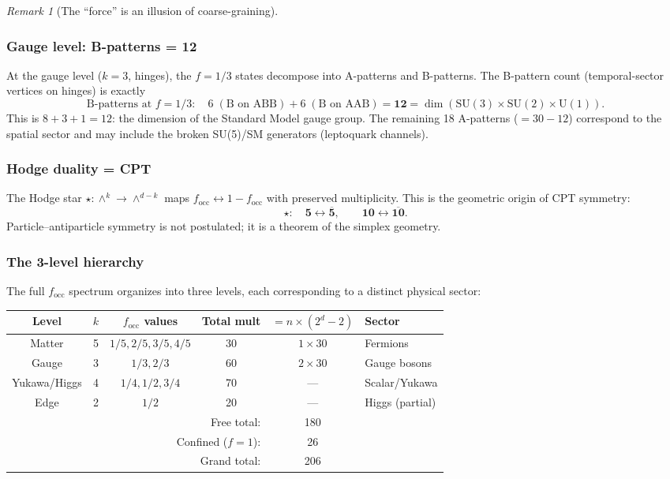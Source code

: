 \documentclass[12pt]{article}
\theoremstyle{remark}
\newtheorem{remark}[theorem]{Remark}
\theoremstyle{definition}
\begin{document}
\begin{remark}[The ``force'' is an illusion of coarse-graining]
\subsubsection{Gauge level: B-patterns = 12}

At the gauge level ($k = 3$, hinges), the $f = 1/3$ states decompose into A-patterns and B-patterns.  The B-pattern count (temporal-sector vertices on hinges) is exactly
\begin{equation}
\text{B-patterns at } f = 1/3: \quad 6\;(\text{B on ABB}) + 6\;(\text{B on AAB}) = \mathbf{12} = \dim(\text{SU}(3) \times \text{SU}(2) \times \text{U}(1)).
\end{equation}
This is $8 + 3 + 1 = 12$: the dimension of the Standard Model gauge group.  The remaining 18 A-patterns ($= 30 - 12$) correspond to the spatial sector and may include the broken SU(5)/SM generators (leptoquark channels).

\subsubsection{Hodge duality = CPT}

The Hodge star $\star: \wedge^k \to \wedge^{d-k}$ maps $f_\mathrm{occ} \leftrightarrow 1 - f_\mathrm{occ}$ with preserved multiplicity.  This is the geometric origin of CPT symmetry:
\begin{equation}
\star: \quad \mathbf{5} \leftrightarrow \overline{\mathbf{5}}, \qquad \mathbf{10} \leftrightarrow \overline{\mathbf{10}}.
\end{equation}
Particle--antiparticle symmetry is not postulated; it is a theorem of the simplex geometry.

\subsubsection{The 3-level hierarchy}

The full $f_\mathrm{occ}$ spectrum organizes into three levels, each corresponding to a distinct physical sector:
\begin{center}
\begin{tabular}{cccccl}
\hline
Level & $k$ & $f_\mathrm{occ}$ values & Total mult & $= n \times (2^d - 2)$ & Sector \\
\hline
Matter & 5 & $1/5, 2/5, 3/5, 4/5$ & 30 & $1 \times 30$ & Fermions \\
Gauge  & 3 & $1/3, 2/3$           & 60 & $2 \times 30$ & Gauge bosons \\
Yukawa/Higgs & 4 & $1/4, 1/2, 3/4$ & 70 & --- & Scalar/Yukawa \\
Edge   & 2 & $1/2$                & 20 & --- & Higgs (partial) \\
\hline
\multicolumn{4}{r}{Free total:} & 180 & \\
\multicolumn{4}{r}{Confined ($f=1$):} & 26 & \\
\multicolumn{4}{r}{Grand total:} & 206 & \\
\hline
\end{tabular}
\end{center}


\end{remark}
\end{document}
